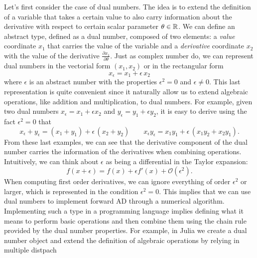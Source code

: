 Let's first consider the case of dual numbers.
The idea is to extend the definition of a variable that takes a certain value to also carry information about the derivative with respect to certain scalar parameter $\theta \in \operatorname{\mathbb{R}}$. 
We can define an abstract type, defined as a dual number, composed of two elements: a \textit{value} coordinate $x_1$ that carries the value of the variable and a \textit{derivative} coordinate $x_2$ with the value of the derivative $\frac{\partial x_1}{\partial \theta}$. 
Just as complex number do, we can represent dual numbers in the vectorial form $(x_1, x_2)$ or in the rectangular form 
\begin{equation}
 x_\epsilon = x_1 + \epsilon \, x_2
\end{equation}
where $\epsilon$ is an abstract number with the properties $\epsilon^2 = 0$ and $\epsilon \neq 0$.
This last representation is quite convenient since it naturally allow us to extend algebraic operations, like addition and multiplication, to dual numbers. 
For example, given two dual numbers $x_\epsilon = x_1 + \epsilon x_2$ and $y_\epsilon = y_1 + \epsilon y_2$, it is easy to derive using the fact $\epsilon^2=0$ that
\begin{equation}
 x_\epsilon + y_\epsilon = (x_1 + y_1) + \epsilon \, (x_2 + y_2)
 \qquad
 x_\epsilon y_\epsilon = x_1 y_1 + \epsilon \, (x_1 y_2 + x_2 y_1) .
\end{equation}
From these last examples, we can see that the derivative component of the dual number carries the information of the derivatives when combining operations.
Intuitively, we can think about $\epsilon$ as being a differential in the Taylor expansion:
\begin{equation}
 f(x + \epsilon) = f(x) + \epsilon f'(x) + \mathcal O (\epsilon^2).
\end{equation}
When computing first order derivatives, we can ignore everything of order $\epsilon^2$ or larger, which is represented in the condition $\epsilon^2 = 0$.
This implies that we can use dual numbers to implement forward AD through a numerical algorithm. Implementing such a type in a programming language implies defining what it means to perform basic operations and then combine them using the chain rule provided by the dual number properties.%
For example, in Julia we create a dual number object and extend the definition of algebraic operations by relying in multiple distpach

